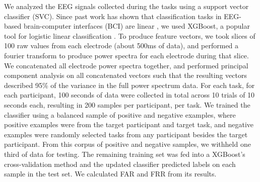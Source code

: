 \documentclass{sigchi-ext}
\begin{document}
We analyzed the EEG signals collected during the tasks using a support vector classifier (SVC). Since past work has shown that classification tasks in EEG-based brain-computer interfaces (BCI) are linear \cite{Garrett2003a}, we used XGBoost, a popular tool for logistic linear classification \cite{Chen2016}. To produce feature vectors, we took slices of 100 raw values from each electrode (about 500ms of data), and performed a fourier transform to produce power spectra for each electrode during that slice. We concatenated all electrode power spectra together, and performed principal component analysis on all concatenated vectors such that the resulting vectors described 95\% of the variance in the full power spectrum data. For each task, for each participant, 100 seconds of data were collected in total across 10 trials of 10 seconds each, resulting in 200 samples per participant, per task. We trained the classifier using a balanced sample of positive and negative examples, where positive examples were from the target participant and target task, and negative examples were randomly selected tasks from any participant besides the target participant. From this corpus of positive and negative samples, we withheld one third of data for testing. The remaining training set was fed into a XGBoost's cross-validation method and the updated classifier predicted labels on each sample in the test set. We calculated FAR and FRR from its results.
\end{document}
